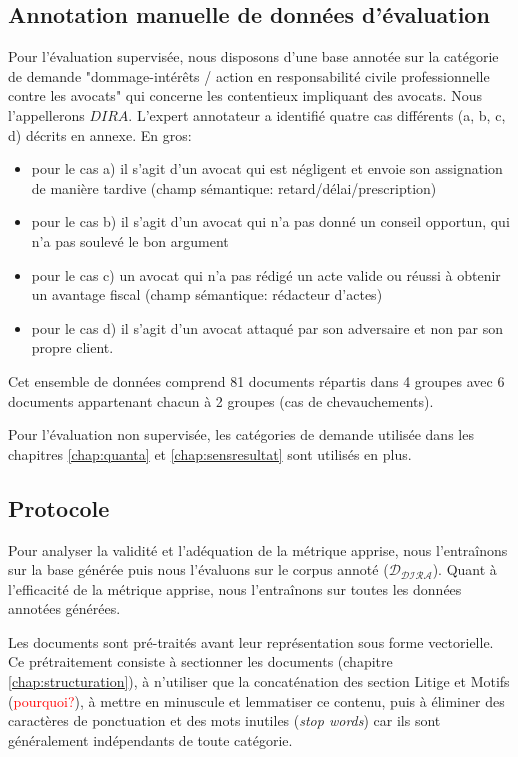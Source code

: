 \subsection{Annotation manuelle de données d'évaluation}
Pour l'évaluation supervisée, nous disposons d'une base annotée sur la catégorie de demande "dommage-intérêts / action en responsabilité civile professionnelle contre les avocats" qui concerne les contentieux impliquant des avocats. Nous l'appellerons $DIRA$. L'expert annotateur a identifié quatre cas différents (a, b, c, d) décrits en annexe. En gros:
\begin{itemize}
\item pour le cas a) il s'agit d'un avocat qui est négligent et envoie son assignation de manière tardive (champ sémantique: retard/délai/prescription)
\item pour le cas b) il s'agit d'un avocat qui n'a pas donné un conseil opportun, qui n'a pas soulevé le bon argument
\item pour le cas c) un avocat qui n'a pas rédigé un acte valide ou réussi à obtenir un avantage fiscal (champ sémantique: rédacteur d'actes)
\item pour le cas d) il s'agit d'un avocat attaqué par son adversaire et non par son propre client.
\end{itemize}

Cet ensemble de données comprend 81 documents répartis dans 4 groupes avec 6 documents appartenant chacun à 2 groupes (cas de chevauchements).

Pour l'évaluation non supervisée, les catégories de demande utilisée dans les chapitres \ref{chap:quanta} et \ref{chap:sensresultat} sont utilisés en plus.

\subsection{Protocole}
Pour analyser la validité et l'adéquation de la métrique apprise, nous l'entraînons sur la base générée puis nous l'évaluons sur le corpus annoté ($\mathcal{D_{\text{DIRA}}}$). Quant à l'efficacité de la métrique apprise, nous l'entraînons sur toutes les données annotées générées.

Les documents sont pré-traités avant leur représentation sous forme vectorielle. Ce prétraitement consiste à sectionner les documents (chapitre \ref{chap:structuration}), à n'utiliser que la concaténation des section Litige et Motifs (\textcolor{red}{pourquoi?}), à mettre en minuscule et lemmatiser ce contenu, puis à éliminer des caractères de ponctuation et des mots inutiles (\textit{stop words})  car ils sont généralement indépendants de toute catégorie.

